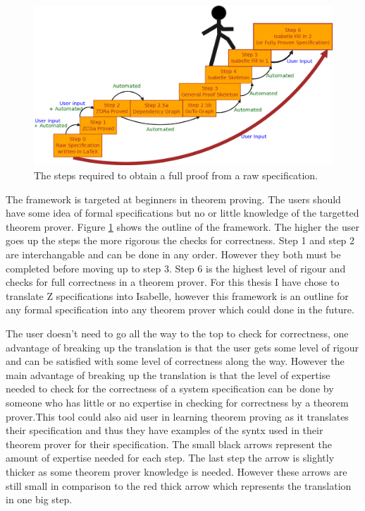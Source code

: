 \begin{figure}[H]
 \begin{center}
 \includegraphics [width=12cm]{Figures/Design/mathlangsteps.png}
 \caption{The steps required to obtain a full proof from a raw specification.}
 \label{fig:steps}
\end{center}
\end{figure} 

The framework is targeted at beginners in theorem proving. The users should have
some idea of formal specifications but no or little knowledge of the targetted
theorem prover. Figure \ref{fig:steps} shows the outline of the framework. The
higher the user goes up the steps the more rigorous the checks for correctness.
Step 1 and step 2 are interchangable and can be done in any order. However they
both must be completed before moving up to step 3. Step 6 is the highest level
of rigour and checks for full correctness in a theorem prover. For this thesis I
have chose to translate Z specifications into Isabelle, however this framework
is an outline for any formal specification into any theorem prover which could
done in the future.

The user doesn't need to go all the way to the top to check for correctness, one
advantage of breaking up the translation is that the user gets some level of
rigour and can be satisfied with some level of correctness along the way.
However the main advantage of breaking up the translation is that the level of
expertise needed to check for the correctness of a system specification can be
done by someone who has little or no expertise in checking for correctness by a
theorem prover.This tool could also aid user in learning theorem proving as it
translates their specification and thus they have examples of the syntx used in
their theorem prover for their specification. The small black arrows represent
the amount of expertise needed for each step. The last step the arrow is
slightly thicker as some theorem prover knowledge is needed. However these
arrows are still small in comparison to the red thick arrow which represents the
translation in one big step.


